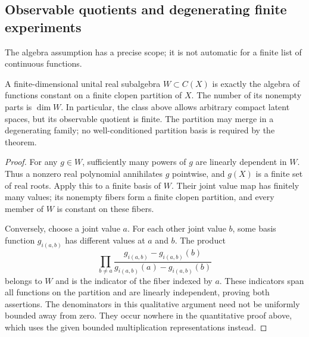 


\subsection{Observable quotients and degenerating finite experiments}
The algebra assumption has a precise scope; it is not automatic for a
finite list of continuous functions.

\begin{proposition}
\label{prop:finite-observable-quotient}
A finite-dimensional unital real subalgebra $W\subset C(X)$ is exactly
the algebra of functions constant on a finite clopen partition of $X$.
The number of its nonempty parts is $\dim W$. In particular, the class
above allows arbitrary compact latent spaces, but its observable
quotient is finite. The partition may merge in a degenerating family;
no well-conditioned partition basis is required by the theorem.
\end{proposition}
\begin{proof}
For any $g\in W$, sufficiently many powers of $g$ are linearly
dependent in $W$. Thus a nonzero real polynomial annihilates $g$
pointwise, and $g(X)$ is a finite set of real roots. Apply this to a
finite basis of $W$. Their joint value map has finitely many values;
its nonempty fibers form a finite clopen partition, and every member
of $W$ is constant on these fibers.

Conversely, choose a joint value $a$. For each other joint value $b$,
some basis function $g_{i(a,b)}$ has different values at $a$ and $b$.
The product
\[
 \prod_{b\ne a}
 \frac{g_{i(a,b)}-g_{i(a,b)}(b)}
      {g_{i(a,b)}(a)-g_{i(a,b)}(b)}
\]
belongs to $W$ and is the indicator of the fiber indexed by $a$.
These indicators span all functions on the partition and are linearly
independent, proving both assertions. The denominators in this
qualitative argument need not be uniformly bounded away from zero.
They occur nowhere in the quantitative proof above, which uses the
given bounded multiplication representations instead.
\end{proof}

